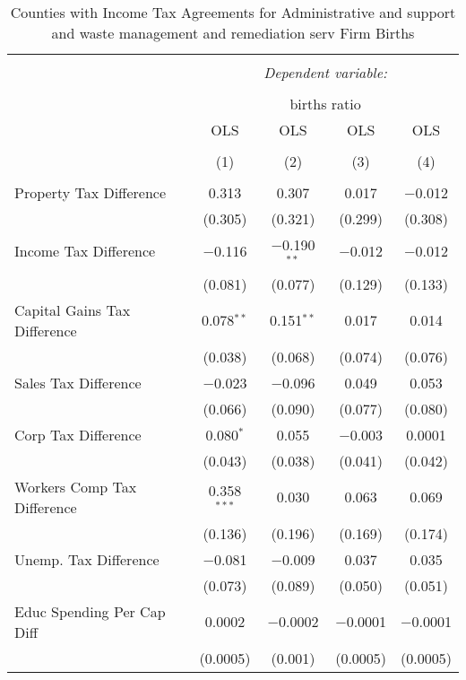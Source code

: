 
\begin{table}[!htbp] \centering 
  \caption{Counties with Income Tax Agreements for  Administrative and support and waste management and remediation serv Firm Births} 
  \label{56rd} 
\begin{tabular}{@{\extracolsep{5pt}}lcccc} 
\\[-1.8ex]\hline 
\hline \\[-1.8ex] 
 & \multicolumn{4}{c}{\textit{Dependent variable:}} \\ 
\cline{2-5} 
\\[-1.8ex] & \multicolumn{4}{c}{births ratio} \\ 
 & OLS & OLS & OLS & OLS \\ 
\\[-1.8ex] & (1) & (2) & (3) & (4)\\ 
\hline \\[-1.8ex] 
 Property Tax Difference & 0.313 & 0.307 & 0.017 & $-$0.012 \\ 
  & (0.305) & (0.321) & (0.299) & (0.308) \\ 
  Income Tax Difference & $-$0.116 & $-$0.190$^{**}$ & $-$0.012 & $-$0.012 \\ 
  & (0.081) & (0.077) & (0.129) & (0.133) \\ 
  Capital Gains Tax Difference & 0.078$^{**}$ & 0.151$^{**}$ & 0.017 & 0.014 \\ 
  & (0.038) & (0.068) & (0.074) & (0.076) \\ 
  Sales Tax Difference & $-$0.023 & $-$0.096 & 0.049 & 0.053 \\ 
  & (0.066) & (0.090) & (0.077) & (0.080) \\ 
  Corp Tax Difference & 0.080$^{*}$ & 0.055 & $-$0.003 & 0.0001 \\ 
  & (0.043) & (0.038) & (0.041) & (0.042) \\ 
  Workers Comp Tax Difference & 0.358$^{***}$ & 0.030 & 0.063 & 0.069 \\ 
  & (0.136) & (0.196) & (0.169) & (0.174) \\ 
  Unemp. Tax Difference & $-$0.081 & $-$0.009 & 0.037 & 0.035 \\ 
  & (0.073) & (0.089) & (0.050) & (0.051) \\ 
  Educ Spending Per Cap Diff & 0.0002 & $-$0.0002 & $-$0.0001 & $-$0.0001 \\ 
  & (0.0005) & (0.001) & (0.0005) & (0.0005) \\ 

\end{tabular}
\end{table}
